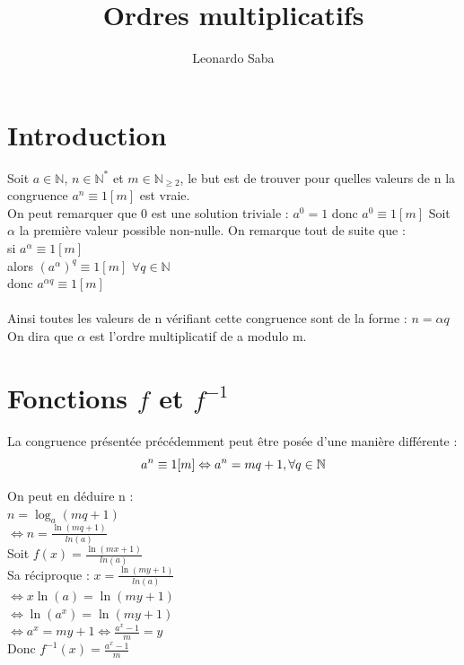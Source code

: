 \documentclass{article}
\title{Ordres multiplicatifs}
\author{Leonardo Saba}
\begin{document}
\maketitle

\section{Introduction}
Soit $a\in\mathbb{N}$, $n\in\mathbb{N}^{*}$ et $m\in\mathbb{N}_{\geq 2}$, le but est de trouver pour quelles valeurs de n la congruence $a^n \equiv 1 [m]$ est vraie.\\
On peut remarquer que 0 est une solution triviale :
$a^0 = 1$ donc $a^0\equiv1[m]$ Soit $\alpha$ la première valeur possible non-nulle.
On remarque tout de suite que :\\
si $a^\alpha\equiv1[m]$\\
alors $(a^\alpha)^q\equiv1[m]$ $\forall q \in\mathbb{N}$\\
donc $a^{\alpha q}\equiv1[m]$ \\\\
Ainsi toutes les valeurs de n vérifiant cette congruence sont de la forme : $n=\alpha q$\\
On dira que $\alpha$ est l'ordre multiplicatif de a modulo m.

\section{Fonctions $f$ et $f^{-1}$}
La congruence présentée précédemment peut être posée d'une manière différente :\\
\begin{equation}
a^n\equiv1[m]\Leftrightarrow a^n = mq+1,\forall q \in\mathbb{N}\notag
\end{equation}

On peut en déduire n :\\
$n=\log_a(mq+1)$\\
$\Leftrightarrow n=\frac{\ln(mq+1)}{ln(a)}$\\
Soit $f(x)=\frac{\ln(mx+1)}{ln(a)}$ \\
Sa réciproque : $x=\frac{\ln(my+1)}{ln(a)}$\\
$\Leftrightarrow x\ln(a)=\ln(my+1)$\\
$\Leftrightarrow \ln(a^x)=\ln(my+1)$\\
$\Leftrightarrow a^x=my+1 \Leftrightarrow \frac{a^x-1}{m}=y$\\
Donc $f^{-1}(x)=\frac{a^x-1}{m}$
\end{document}
